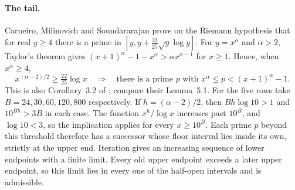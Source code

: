 \paragraph{The tail.}
Carneiro, Milinovich and Soundararajan
\cite[Theorem~5]{CarneiroMilinovichSoundararajan2017Fourier} prove on the Riemann
hypothesis that for real $y\ge4$ there is a prime in $[y,y+\tfrac{22}{25}\sqrt y\log y]$.
For $y=x^\alpha$ and $\alpha>2$, Taylor's theorem gives
$(x+1)^\alpha-1-x^\alpha>\alpha x^{\alpha-1}$ for $x\ge1$. Hence, when $x^\alpha\ge4$,
\[
 x^{(\alpha-2)/2}\ge\tfrac{22}{25}\log x
 \quad\Longrightarrow\quad
 \text{there is a prime } p \text{ with } x^\alpha\le p<(x+1)^\alpha-1 .
\]
This is also Corollary~3.2 of \cite{ChamberlandStraub2026Prime}; compare their
Lemma~5.1. For the five rows take $B=24,30,60,120,800$ respectively. If
$h=(\alpha-2)/2$, then $Bh\log10>1$ and $10^{Bh}>3B$ in each case. The function
$x^h/\log x$ increases past $10^B$, and $\log10<3$, so the implication applies for every
$x\ge10^B$. Each prime $p$ beyond this threshold therefore has a successor whose floor
interval lies inside its own, strictly at the upper end. Iteration gives an increasing
sequence of lower endpoints with a finite limit. Every old upper endpoint exceeds a
later upper endpoint, so this limit lies in every one of the half-open intervals and
is admissible.

